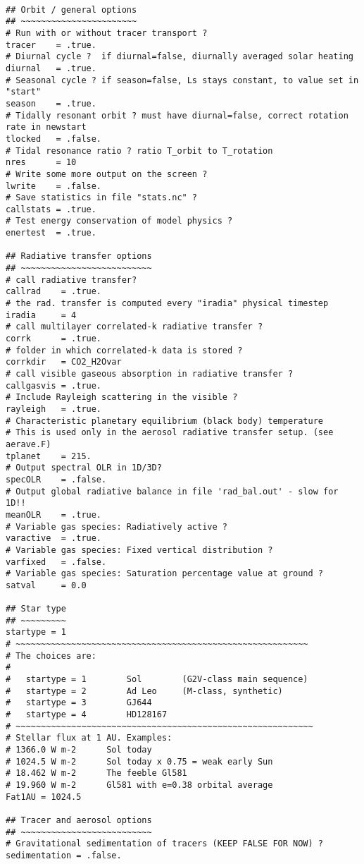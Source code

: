 {\footnotesize
\begin{verbatim}

## Orbit / general options
## ~~~~~~~~~~~~~~~~~~~~~~~
# Run with or without tracer transport ?
tracer    = .true.
# Diurnal cycle ?  if diurnal=false, diurnally averaged solar heating
diurnal   = .true.
# Seasonal cycle ? if season=false, Ls stays constant, to value set in "start"
season    = .true.
# Tidally resonant orbit ? must have diurnal=false, correct rotation rate in newstart
tlocked   = .false.
# Tidal resonance ratio ? ratio T_orbit to T_rotation
nres      = 10
# Write some more output on the screen ?
lwrite    = .false.
# Save statistics in file "stats.nc" ?
callstats = .true.
# Test energy conservation of model physics ?
enertest  = .true.

## Radiative transfer options
## ~~~~~~~~~~~~~~~~~~~~~~~~~~
# call radiative transfer?
callrad    = .true.
# the rad. transfer is computed every "iradia" physical timestep
iradia     = 4
# call multilayer correlated-k radiative transfer ?
corrk      = .true.
# folder in which correlated-k data is stored ?
corrkdir   = CO2_H2Ovar
# call visible gaseous absorption in radiative transfer ?
callgasvis = .true.
# Include Rayleigh scattering in the visible ?
rayleigh   = .true.
# Characteristic planetary equilibrium (black body) temperature
# This is used only in the aerosol radiative transfer setup. (see aerave.F)
tplanet    = 215.
# Output spectral OLR in 1D/3D?
specOLR    = .false.
# Output global radiative balance in file 'rad_bal.out' - slow for 1D!!
meanOLR    = .true.
# Variable gas species: Radiatively active ?
varactive  = .true.
# Variable gas species: Fixed vertical distribution ?
varfixed   = .false.
# Variable gas species: Saturation percentage value at ground ?
satval     = 0.0

## Star type
## ~~~~~~~~~
startype = 1
# ~~~~~~~~~~~~~~~~~~~~~~~~~~~~~~~~~~~~~~~~~~~~~~~~~~~~~~~~~~
# The choices are:
#
#	startype = 1		Sol        (G2V-class main sequence)
#	startype = 2		Ad Leo     (M-class, synthetic)
#   startype = 3        GJ644
#   startype = 4        HD128167
# ~~~~~~~~~~~~~~~~~~~~~~~~~~~~~~~~~~~~~~~~~~~~~~~~~~~~~~~~~~~
# Stellar flux at 1 AU. Examples:
# 1366.0 W m-2		Sol today
# 1024.5 W m-2		Sol today x 0.75 = weak early Sun
# 18.462 W m-2		The feeble Gl581
# 19.960 W m-2		Gl581 with e=0.38 orbital average
Fat1AU = 1024.5

## Tracer and aerosol options
## ~~~~~~~~~~~~~~~~~~~~~~~~~~
# Gravitational sedimentation of tracers (KEEP FALSE FOR NOW) ?
sedimentation = .false.


\end{verbatim}}
